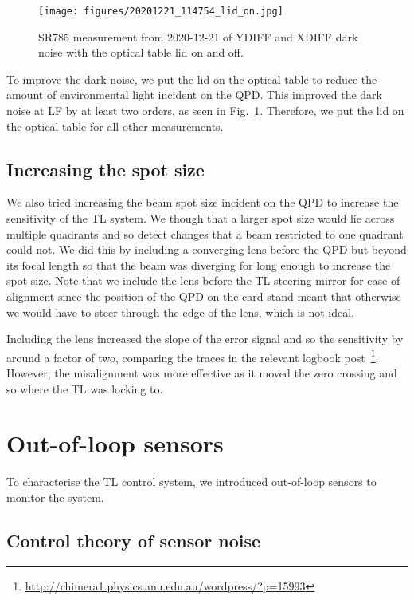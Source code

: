 \documentclass[aps,pra,superscriptaddress,reprint,nofootinbib]{revtex4-1}
\begin{document}
\begin{figure}
\texttt{[image: figures/20201221\_114754\_lid\_on.jpg]}
\caption{SR785 measurement from 2020-12-21 of YDIFF and XDIFF dark noise with the optical table lid on and off.}
\label{fig:dark_noise_lid_on}
\end{figure}

To improve the dark noise, we put the lid on the optical table to reduce the amount of environmental light incident on the QPD. This improved the dark noise at LF by at least two orders, as seen in Fig.~\ref{fig:dark_noise_lid_on}. Therefore, we put the lid on the optical table for all other measurements.

\subsection{Increasing the spot size}
\label{sec:spot_size}

We also tried increasing the beam spot size incident on the QPD to increase the sensitivity of the TL system. We though that a larger spot size would lie across multiple quadrants and so detect changes that a beam restricted to one quadrant could not. We did this by including a converging lens before the QPD but beyond its focal length so that the beam was diverging for long enough to increase the spot size. Note that we include the lens before the TL steering mirror for ease of alignment since the position of the QPD on the card stand meant that otherwise we would have to steer through the edge of the lens, which is not ideal.

Including the lens increased the slope of the error signal and so the sensitivity by around a factor of two, comparing the traces in the relevant logbook post~\footnote{\url{http://chimera1.physics.anu.edu.au/wordpress/?p=15993}}. However, the misalignment was more effective as it moved the zero crossing and so where the TL was locking to.


\section{Out-of-loop sensors}
\label{sec:out-of-loop_sensors}

To characterise the TL control system, we introduced out-of-loop sensors to monitor the system.

\subsection{Control theory of sensor noise}
\end{document}
